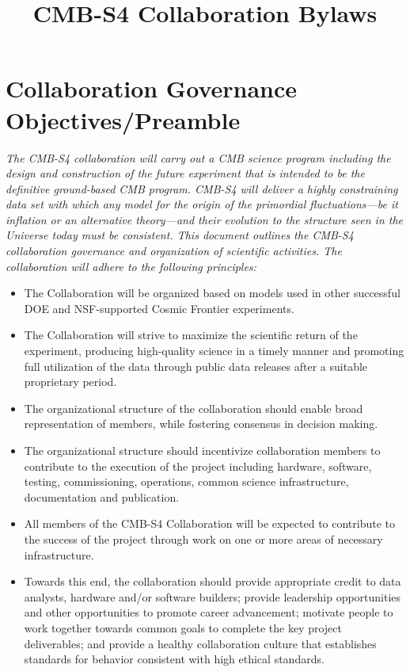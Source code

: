 \documentclass[12pt]{article}
\newcommand{\Comment}[1]{\textcolor{Blue}{(Comment: #1)}}
\begin{document}
\title{CMB-S4 Collaboration Bylaws}
\maketitle


\tableofcontents


\newpage

\section{Collaboration Governance Objectives/Preamble}

{ \it 
The CMB-S4 collaboration will carry out a CMB science program including the design and construction of the future experiment that is intended to be the definitive ground-based CMB program. CMB-S4 will deliver a highly constraining data set with which any model for the origin of the primordial fluctuations---be it inflation or an alternative theory---and their evolution to the structure seen in the Universe today must be consistent. This document outlines the CMB-S4 collaboration governance and organization of scientific activities. The collaboration will adhere to the following principles:
}

\begin{itemize}
\item The Collaboration will be organized based on models used in other successful DOE and NSF-supported Cosmic Frontier experiments.

\item The Collaboration will strive to maximize the scientific return of the experiment, producing high-quality science in a timely manner and promoting full utilization of the data through public data releases after a suitable proprietary period.

\item The organizational structure of the collaboration should enable broad representation of members, while fostering consensus in decision making.

\item The organizational structure should incentivize collaboration members to contribute to the execution of the project including hardware, software, testing, commissioning, operations, common science infrastructure, documentation and publication.  

\item All members of the CMB-S4 Collaboration will be expected to contribute to the success of the project through work on one or more areas of necessary infrastructure.

\item Towards this end, the collaboration should provide appropriate credit to data analysts, hardware and/or software builders; provide leadership opportunities and other opportunities to promote career advancement; motivate people to work together towards common goals to complete the key project deliverables; and provide a healthy collaboration culture that establishes standards for behavior consistent with high ethical standards.

\end{itemize}
\end{document}
